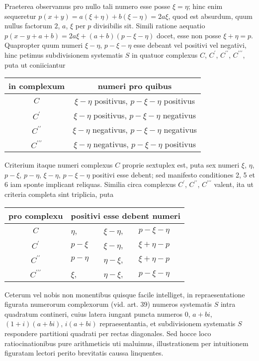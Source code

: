 \documentclass[twoside,12pt]{memoir}
\begin{document}
Praeterea observamus pro nullo tali numero esse posse \(\xi=\eta\); hinc enim sequeretur \(p(x+y)=a(\xi+\eta)+b(\xi-\eta)=2 a \xi\), quod est absurdum, quum nullus factorum \(2\), \( a\), \( \xi\) per \(p\) divisibilis sit. Simili ratione aequatio \(p(x-y+a+b)=2 a \xi+(a+b)(p-\xi-\eta)\) docet, esse non posse \(\xi+\eta=p\). Quapropter quum numeri \(\xi-\eta\), \( p-\xi-\eta\) esse debeant vel positivi vel negativi, hinc petimus subdivisionem systematis \(S\) in quatuor complexus \(C\), \( C^{\prime}\), \( C^{\prime \prime}\), \( C^{\prime \prime \prime}\), puta ut coniiciantur
\begin{center}
\begin{tabular}{c|c}
in complexum & numeri pro quibus \\
\hline
\(C\) & \(\xi-\eta\) positivus, \(p-\xi-\eta\) positivus \\
\(C^{\prime}\) & \(\xi-\eta\) positivus, \(p-\xi-\eta\) negativus \\
\(C^{\prime \prime}\) & \(\xi-\eta\) negativus, \(p-\xi-\eta\) negativus \\
\(C^{\prime \prime \prime}\) & \(\xi-\eta\) negativus, \(p-\xi-\eta\) positivus \\
\end{tabular}
\end{center}
Criterium itaque numeri complexus \(C\) proprie sextuplex est, puta sex numeri \(\xi\), \( \eta\), \( p-\xi\), \( p-\eta\), \( \xi-\eta\), \( p-\xi-\eta\) positivi esse debent; sed manifesto conditiones 2, 5 et 6 iam sponte implicant reliquas. Similia circa complexus \(C^{\prime}\), \( C^{\prime \prime}\), \(C^{\prime \prime \prime}\) valent, ita ut criteria completa sint triplicia, puta\pagebreak%
\begin{center}
\begin{tabular}{c|lll}
pro complexu & \multicolumn{3}{c}{positivi esse debent numeri}   \\
\hline
\(C\) & \(\eta\), & \(\xi-\eta\), & \(p-\xi-\eta\) \\
\(C^{\prime}\) & \(p-\xi\) & \(\xi-\eta\), & \(\xi+\eta-p\)   \\
\(C^{\prime \prime}\) & \(p-\eta\)& \(\eta-\xi\), & \(\xi+\eta-p\)   \\
\(C^{\prime \prime \prime}\) & \(\xi\), & \(\eta-\xi\), & \(p-\xi-\eta\) \\
\end{tabular}
\end{center}

Ceterum vel nobis non monentibus quisque facile intelliget, in repraesentatione figurata numerorum complexorum (vid. art. 39) numeros systematis \(S\) intra quadratum contineri, cuius latera iungant puncta numeros \(0\), \(a+b i\), \((1+i)(a+b i)\), \(i(a+b i)\) repraesentantia, et subdivisionem systematis \(S\) respondere partitioni quadrati per rectas diagonales. Sed hocce loco ratiocinationibus pure arithmeticis uti maluimus, illustrationem per intuitionem figuratam lectori perito brevitatis caussa linquentes.
\end{document}
